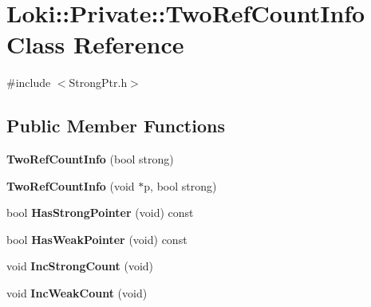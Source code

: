 \hypertarget{classLoki_1_1Private_1_1TwoRefCountInfo}{}\section{Loki\+:\+:Private\+:\+:Two\+Ref\+Count\+Info Class Reference}
\label{classLoki_1_1Private_1_1TwoRefCountInfo}


{\ttfamily \#include $<$Strong\+Ptr.\+h$>$}

\subsection*{Public Member Functions}
\begin{DoxyCompactItemize}
\item 
\hypertarget{classLoki_1_1Private_1_1TwoRefCountInfo_ad6514d29185e886dad3a89dd6c6ea505}{}{\bfseries Two\+Ref\+Count\+Info} (bool strong)\label{classLoki_1_1Private_1_1TwoRefCountInfo_ad6514d29185e886dad3a89dd6c6ea505}

\item 
\hypertarget{classLoki_1_1Private_1_1TwoRefCountInfo_afa2cb8cd1584b3a57c25ab2f2b0d8f29}{}{\bfseries Two\+Ref\+Count\+Info} (void $\ast$p, bool strong)\label{classLoki_1_1Private_1_1TwoRefCountInfo_afa2cb8cd1584b3a57c25ab2f2b0d8f29}

\item 
\hypertarget{classLoki_1_1Private_1_1TwoRefCountInfo_a26289c848ed507acf5a2fa2f48d162eb}{}bool {\bfseries Has\+Strong\+Pointer} (void) const \label{classLoki_1_1Private_1_1TwoRefCountInfo_a26289c848ed507acf5a2fa2f48d162eb}

\item 
\hypertarget{classLoki_1_1Private_1_1TwoRefCountInfo_a1b3c31d25009a48184cc5198e7bc3efe}{}bool {\bfseries Has\+Weak\+Pointer} (void) const \label{classLoki_1_1Private_1_1TwoRefCountInfo_a1b3c31d25009a48184cc5198e7bc3efe}

\item 
\hypertarget{classLoki_1_1Private_1_1TwoRefCountInfo_a5737023579f9b5761e6a9922ab93e29f}{}void {\bfseries Inc\+Strong\+Count} (void)\label{classLoki_1_1Private_1_1TwoRefCountInfo_a5737023579f9b5761e6a9922ab93e29f}

\item 
\hypertarget{classLoki_1_1Private_1_1TwoRefCountInfo_a7510e96ae727fe452f8861b45b3d9c14}{}void {\bfseries Inc\+Weak\+Count} (void)\label{classLoki_1_1Private_1_1TwoRefCountInfo_a7510e96ae727fe452f8861b45b3d9c14}


\end{DoxyCompactItemize}
